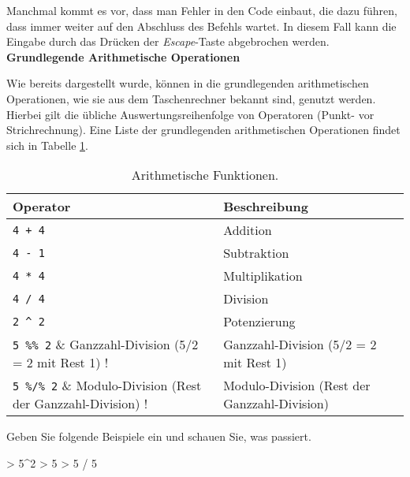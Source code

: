 Manchmal kommt es vor, dass man Fehler in den Code einbaut, die dazu führen, dass \R{} immer weiter auf den Abschluss des Befehls wartet. In diesem Fall kann die Eingabe durch das Drücken der \emph{Escape}-Taste abgebrochen werden. \\

\textbf{Grundlegende Arithmetische Operationen}

Wie bereits dargestellt wurde, können in \R{} die grundlegenden arithmetischen Operationen, wie sie aus dem Taschenrechner bekannt sind, genutzt werden. Hierbei gilt die übliche Auswertungsreihenfolge von Operatoren (Punkt- vor Strichrechnung). Eine Liste der grundlegenden arithmetischen Operationen findet sich in Tabelle \ref{tab:arithmetik}. 

\begin{table}[h]
  \centering
  \caption{Arithmetische Funktionen.}
  \label{tab:arithmetik}
\begin{footnotesize}
\begin{tabular}{ll}
\hline
Operator & Beschreibung             \tabularnewline
\hline
\verb!4 + 4!	& Addition            \tabularnewline
\verb!4 - 1!	& Subtraktion         \tabularnewline
\verb!4 * 4!	& Multiplikation      \tabularnewline
\verb!4 / 4!	& Division            \tabularnewline
\verb!2 ^ 2!	& Potenzierung        \tabularnewline
\verb!5 %% 2!	& Ganzzahl-Division (5/2 = 2 mit Rest 1)  \tabularnewline
\verb!5 %/% 2!	& Modulo-Division (Rest der Ganzzahl-Division)  \tabularnewline
\hline
\end{tabular}
\end{footnotesize}
\end{table}

Geben Sie folgende Beispiele ein und schauen Sie, was passiert.

\begin{Schunk}
\begin{Sinput}
> 5^2
> 5 %% 2 
> 5 / 5
\end{Sinput}
\end{Schunk}
                                                  
%  

